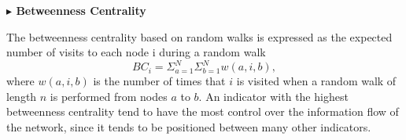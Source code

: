 \documentclass[12pt]{article}  %
\begin{document}
\vspace{0.7mm}\begin{itshape}
\textbf{$\blacktriangleright$ Betweenness Centrality}\end{itshape}

The betweenness centrality based on random walks is expressed as the expected number of visits to each node i during a random walk
\begin{equation}
BC_i=\Sigma^N_{a=1}\Sigma_{b=1}^Nw(a,i,b),
\end{equation}
where $w(a, i, b)$ is the number of times that $i$ is visited when a random walk of
length $n$ is performed from nodes $a$ to $b$. An indicator with the highest betweenness centrality tend to have the most control over the information flow of the network, since it tends to be positioned between many other indicators.

\end{document}
